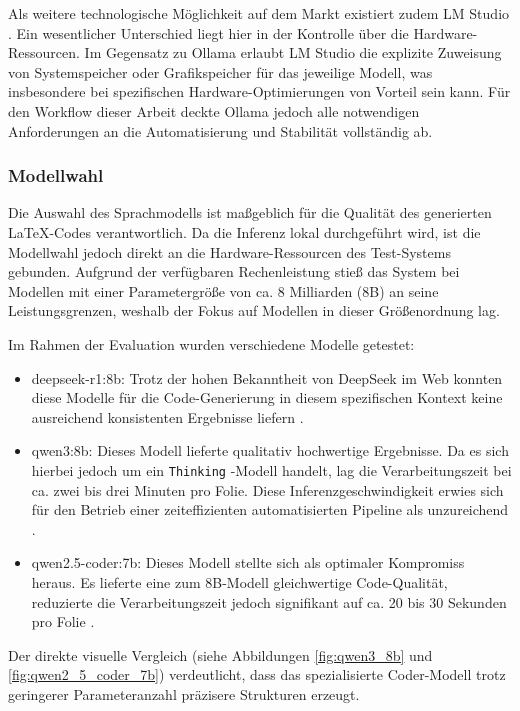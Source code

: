 \documentclass[a4paper]{article}
\begin{document}
Als weitere technologische Möglichkeit auf dem Markt existiert zudem {LM Studio} \citep{LMStudio}. Ein wesentlicher Unterschied liegt hier in der Kontrolle über die Hardware-Ressourcen. Im Gegensatz zu Ollama erlaubt LM Studio die explizite Zuweisung von Systemspeicher oder Grafikspeicher für das jeweilige Modell, was insbesondere bei spezifischen Hardware-Optimierungen von Vorteil sein kann. Für den Workflow dieser Arbeit deckte Ollama jedoch alle notwendigen Anforderungen an die Automatisierung und Stabilität vollständig ab.

\subsubsection{Modellwahl}

Die Auswahl des Sprachmodells ist maßgeblich für die Qualität des generierten {LaTeX}-Codes verantwortlich. Da die Inferenz lokal durchgeführt wird, ist die Modellwahl jedoch direkt an die Hardware-Ressourcen des Test-Systems gebunden. Aufgrund der verfügbaren Rechenleistung stieß das System bei Modellen mit einer Parametergröße von ca. 8 Milliarden (8B) an seine Leistungsgrenzen, weshalb der Fokus auf Modellen in dieser Größenordnung lag.

Im Rahmen der Evaluation wurden verschiedene Modelle getestet:
\begin{itemize}
	\item {deepseek-r1:8b:} Trotz der hohen Bekanntheit von DeepSeek im Web konnten diese Modelle für die Code-Generierung in diesem spezifischen Kontext keine ausreichend konsistenten Ergebnisse liefern \citep{deepseek}.
	\item {qwen3:8b:} Dieses Modell lieferte qualitativ hochwertige Ergebnisse. Da es sich hierbei jedoch um ein \texttt{Thinking} -Modell handelt, lag die Verarbeitungszeit bei ca. zwei bis drei Minuten pro Folie. Diese Inferenzgeschwindigkeit erwies sich für den Betrieb einer zeiteffizienten automatisierten Pipeline als unzureichend \citep{Qwen3}.
	\item {qwen2.5-coder:7b:} Dieses Modell stellte sich als optimaler Kompromiss heraus. Es lieferte eine zum 8B-Modell gleichwertige Code-Qualität, reduzierte die Verarbeitungszeit jedoch signifikant auf ca. 20 bis 30 Sekunden pro Folie \citep{Qwen25Coder}. 
\end{itemize}

Der direkte visuelle Vergleich (siehe Abbildungen \ref{fig:qwen3_8b} und \ref{fig:qwen2_5_coder_7b}) verdeutlicht, dass das spezialisierte Coder-Modell trotz geringerer Parameteranzahl präzisere Strukturen erzeugt.
\end{document}
